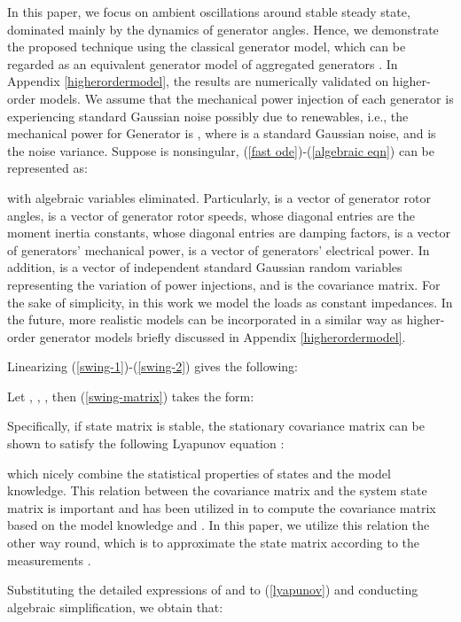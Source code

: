 \documentclass[journal]{IEEEtran}
\begin{document}
In this paper, we focus on ambient oscillations around stable steady state, dominated mainly by the dynamics of generator angles. Hence, we demonstrate the proposed technique using the classical generator model, which can be regarded as an equivalent generator model of aggregated generators \cite{Chow:2014}. In Appendix \ref{higherordermodel}, the results are numerically validated on higher-order models.
We assume that the mechanical power injection of each generator is experiencing standard Gaussian noise possibly due to renewables, i.e., the mechanical power for Generator  is , where  is a standard Gaussian noise, and  is the noise variance.
Suppose  is nonsingular, (\ref{fast ode})-(\ref{algebraic eqn}) can be represented as:

with algebraic variables  eliminated. Particularly,  is a vector of generator rotor angles,  is a vector of generator rotor speeds,  whose diagonal entries are the moment inertia constants,  whose diagonal entries are damping factors,  is a vector of generators' mechanical power,  is a vector of generators' electrical power. In addition,  is a vector of independent standard Gaussian random variables representing the variation of power injections, and  is the covariance matrix.
For the sake of simplicity, in this work we model the loads as constant impedances. In the future, more realistic models can be incorporated in a similar way as higher-order generator models briefly discussed in Appendix \ref{higherordermodel}.


Linearizing (\ref{swing-1})-(\ref{swing-2}) gives the following:

Let , , , then (\ref{swing-matrix}) takes the form:

Specifically, if state matrix  is stable, the stationary covariance matrix  can be shown to satisfy the following Lyapunov equation \cite{Hines:2015}\cite{Gardiner:2009}:

which nicely combine the statistical properties of states and the model knowledge.
This relation between the covariance matrix  and the system state matrix is important and has been utilized in \cite{Hines:2015} to compute the covariance matrix  based on the model knowledge  and . In this paper, we utilize this relation the other way round, which is to approximate the state matrix  according to the measurements .

Substituting the detailed expressions of  and  to (\ref{lyapunov}) and conducting algebraic simplification, we obtain that:
\end{document}
